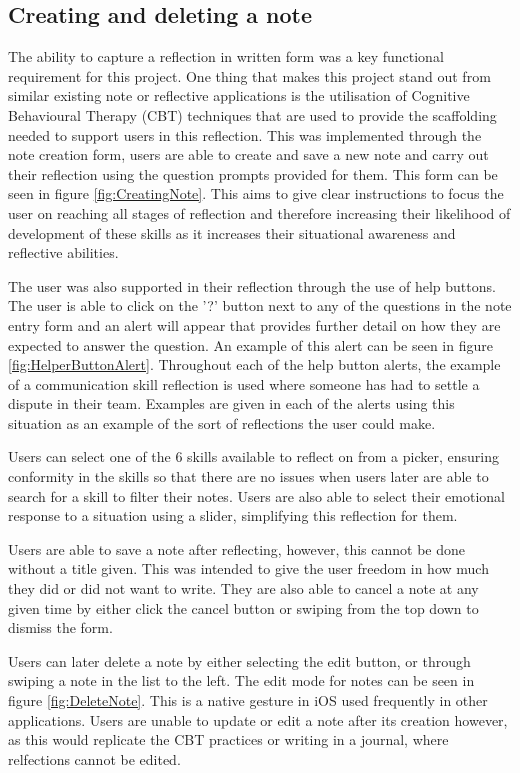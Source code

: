 \documentclass{l4proj}
\begin{document}
\subsection{Creating and deleting a note}

The ability to capture a reflection in written form was a key functional requirement for this project. One thing that makes this project stand out from similar existing note or reflective applications is the utilisation of Cognitive Behavioural Therapy (CBT) techniques that are used to provide the scaffolding needed to support users in this reflection. This was implemented through the note creation form, users are able to create and save a new note and carry out their reflection using the question prompts provided for them. This form can be seen in figure \ref{fig:CreatingNote}. This aims to give clear instructions to focus the user on reaching all stages of reflection and therefore increasing their likelihood of development of these skills as it increases their situational awareness and reflective abilities. 

The user was also supported in their reflection through the use of help buttons. The user is able to click on the '?' button next to any of the questions in the note entry form and an alert will appear that provides further detail on how they are expected to answer the question. An example of this alert can be seen in figure \ref{fig:HelperButtonAlert}. Throughout each of the help button alerts, the example of a communication skill reflection is used where someone has had to settle a dispute in their team. Examples are given in each of the alerts using this situation as an example of the sort of reflections the user could make.

Users can select one of the 6 skills available to reflect on from a picker, ensuring conformity in the skills so that there are no issues when users later are
able to search for a skill to filter their notes. Users are also able to select their emotional response to a situation using a slider, simplifying this
reflection for them. 

Users are able to save a note after reflecting, however, this cannot be done without a title given. This was intended to give the user freedom in how much they did or did not want to write. They are also able to cancel a note at any given time by either click the cancel button or swiping from the top down to dismiss the form. 

Users can later delete a note by either selecting the edit button, or through swiping a note in the list to the left. The edit mode for notes can be seen in figure \ref{fig:DeleteNote}. This is a native gesture in iOS used frequently in other applications. Users are unable to update or edit a note after its creation however, as this would replicate the CBT practices or writing in a journal, where relfections cannot be edited. 
\end{document}
